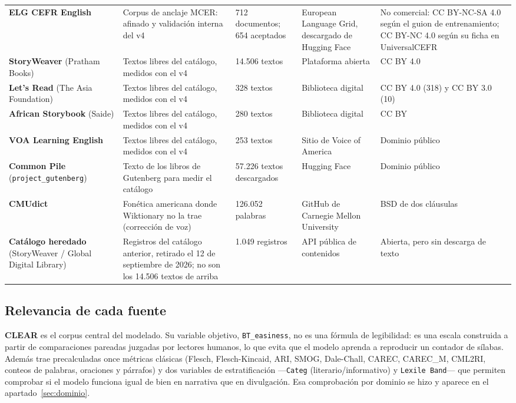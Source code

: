\documentclass[11pt,a4paper]{article}
\newcommand{\cod}[1]{\texttt{\small #1}}
\begin{document}
\begin{longtable}{@{}L{2.4cm} L{3.2cm} L{2.2cm} L{2.8cm} L{3.2cm}@{}}
\addlinespace
\textbf{ELG CEFR English} & Corpus de anclaje MCER: afinado y validación interna del v4 & 712 documentos; 654 aceptados & European Language Grid, descargado de Hugging Face \parencite{breuker2023cefr} & No comercial: CC BY-NC-SA 4.0 según el guion de entrenamiento; CC BY-NC 4.0 según su ficha en UniversalCEFR \\
\addlinespace
\textbf{Story\-Weaver} (Pratham Books) & Textos libres del catálogo, medidos con el v4 & 14.506 textos & Plataforma abierta \parencite{prathambooks_storyweaver} & CC BY 4.0 \\
\addlinespace
\textbf{Let's Read} (The Asia Foundation) & Textos libres del catálogo, medidos con el v4 & 328 textos & Biblioteca digital \parencite{asiafoundation_letsread} & CC BY 4.0 (318) y CC BY 3.0 (10) \\
\addlinespace
\textbf{African Story\-book} (Saide) & Textos libres del catálogo, medidos con el v4 & 280 textos & Biblioteca digital \parencite{saide_africanstorybook} & CC BY \\
\addlinespace
\textbf{VOA Learning English} & Textos libres del catálogo, medidos con el v4 & 253 textos & Sitio de Voice of America \parencite{voa_learningenglish} & Dominio público \\
\addlinespace
\textbf{Common Pile} (\cod{project\_\allowbreak gutenberg}) & Texto de los libros de Gutenberg para medir el catálogo & 57.226 textos descargados & Hugging Face \parencite{kandpal2025commonpile} & Dominio público \\
\addlinespace
\textbf{CMUdict} & Fonética americana donde Wiktionary no la trae (corrección de voz) & 126.052 palabras & GitHub de Carnegie Mellon University \parencite{cmudict} & BSD de dos cláusulas \\
\addlinespace
\textbf{Catálogo heredado} (Story\-Weaver / Global Digital Library) & Registros del catálogo anterior, retirado el 12 de septiembre de 2026; no son los 14.506 textos de arriba & 1.049 registros & API pública de contenidos & Abierta, pero sin descarga de texto \\
\bottomrule
\end{longtable}
\endgroup

\subsection{Relevancia de cada fuente}

\textbf{CLEAR} es el corpus central del modelado. Su variable objetivo,
\cod{BT\_easiness}, no es una fórmula de legibilidad: es una escala construida a partir
de comparaciones pareadas juzgadas por lectores humanos, lo que evita que el modelo
aprenda a reproducir un contador de sílabas. Además trae precalculadas once métricas
clásicas (Flesch, Flesch-Kincaid, ARI, SMOG, Dale-Chall, CAREC, CAREC\_M, CML2RI,
conteos de palabras, oraciones y párrafos) y dos variables de estratificación
—\cod{Categ} (literario/informativo) y \cod{Lexile Band}— que permiten comprobar si el
modelo funciona igual de bien en narrativa que en divulgación. Esa comprobación por
dominio se hizo y aparece en el apartado~\ref{sec:dominio}.
\end{document}
